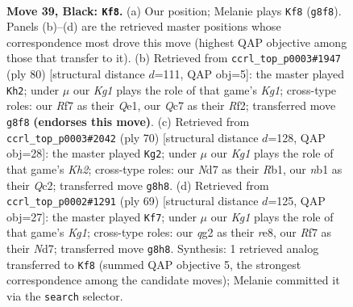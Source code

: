 \documentclass[11pt]{article}
\begin{document}
\clearpage

\begin{figure}[p]\centering
\begin{subfigure}{0.46\textwidth}\centering
\resizebox{\linewidth}{!}{%
\newchessgame
\chessboard[
  setfen={2b3k1/p1qn1r1p/1r3b2/P4P1N/1p1p4/1p6/R3P1Q1/1NBK2R1 b - - 1 39},
  showmover=false,
  pgfstyle=straightmove, color=movearrow, markmove={g8-f8}
]}
\caption{}
\end{subfigure}\hfill
\begin{subfigure}{0.46\textwidth}\centering
\resizebox{\linewidth}{!}{%
\newchessgame
\chessboard[
  setfen={3r2n1/1b2rpk1/3q2p1/4p1P1/pP2P2P/3PR2N/5R2/4QBK1 w - - 0 41},
  showmover=false,
  pgfstyle=straightmove, color=movearrow, markmove={g1-h2}
]}
\caption{}
\end{subfigure}
\\[4pt]
\begin{subfigure}{0.46\textwidth}\centering
\resizebox{\linewidth}{!}{%
\newchessgame
\chessboard[
  setfen={rr5k/4q3/1p1p2p1/1NnPp3/PR2PbB1/7P/2Q2P1K/1R6 w - - 0 36},
  showmover=false,
  pgfstyle=straightmove, color=movearrow, markmove={h2-g2}
]}
\caption{}
\end{subfigure}\hfill
\begin{subfigure}{0.46\textwidth}\centering
\resizebox{\linewidth}{!}{%
\newchessgame
\chessboard[
  setfen={1rb1R1k1/3n4/p2p1q2/2pP2pP/2P3p1/3Q1r2/P1B3N1/R5K1 b - - 6 35},
  showmover=false,
  pgfstyle=straightmove, color=movearrow, markmove={g8-f7}
]}
\caption{}
\end{subfigure}
\caption{\textbf{Move 39, Black: \texttt{Kf8}.} (a) Our position; Melanie plays \texttt{Kf8} (\texttt{g8f8}). Panels (b)--(d) are the retrieved master positions whose correspondence most drove this move (highest QAP objective among those that transfer to it). (b) Retrieved from \texttt{ccrl\_top\_p0003\#1947} (ply 80) [structural distance $d$=111, QAP obj=5]: the master played \texttt{Kh2}; under $\mu$ our \emph{Kg1} plays the role of that game's \emph{Kg1}; cross-type roles: our \emph{R}f7 as their \emph{Q}e1, our \emph{Q}c7 as their \emph{R}f2; transferred move \texttt{g8f8} \textbf{(endorses this move)}. (c) Retrieved from \texttt{ccrl\_top\_p0003\#2042} (ply 70) [structural distance $d$=128, QAP obj=28]: the master played \texttt{Kg2}; under $\mu$ our \emph{Kg1} plays the role of that game's \emph{Kh2}; cross-type roles: our \emph{N}d7 as their \emph{R}b1, our \emph{n}b1 as their \emph{Q}c2; transferred move \texttt{g8h8}. (d) Retrieved from \texttt{ccrl\_top\_p0002\#1291} (ply 69) [structural distance $d$=125, QAP obj=27]: the master played \texttt{Kf7}; under $\mu$ our \emph{Kg1} plays the role of that game's \emph{Kg1}; cross-type roles: our \emph{q}g2 as their \emph{r}e8, our \emph{R}f7 as their \emph{N}d7; transferred move \texttt{g8h8}. Synthesis: 1 retrieved analog transferred to \texttt{Kf8} (summed QAP objective 5, the strongest correspondence among the candidate moves); Melanie committed it via the \texttt{search} selector.}
\label{fig:thought-m77}
\end{figure}
\end{document}
